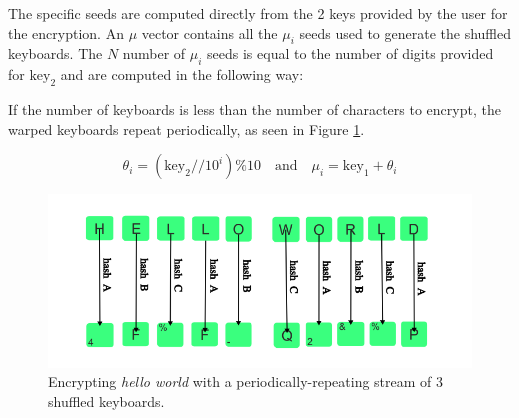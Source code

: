 \documentclass{article}
\begin{document}
The specific seeds are computed directly from the 2 keys provided by the user for the encryption.
An $\mu$ vector contains all the $\mu_i$ seeds used to generate the shuffled keyboards. 
The $N$ number of $\mu_i$ seeds is equal to the number of digits provided for $\mathrm{key_2}$ and are computed in the following way:


If the number of keyboards is less than the number of characters to encrypt, the warped keyboards repeat periodically, as seen in Figure \ref{fig:helloworld}.

\[
\theta_i =  (\mathrm{key_2} // 10^{i}) \% 10 \quad \mathrm{and} \quad \mu_i = \mathrm{key_1}  + \theta_i
\]













\begin{figure}[h]
  \centering
  \includegraphics[width=0.7\linewidth]{img/helloworld.png}
  \caption{Encrypting \textit{hello world} with a periodically-repeating stream of 3 shuffled keyboards.}
  \label{fig:helloworld}
\end{figure}
\end{document}

